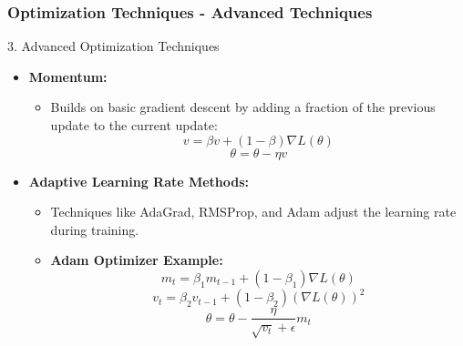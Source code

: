 \documentclass[aspectratio=169]{beamer}
\begin{document}
\begin{frame}[fragile]
    \frametitle{Optimization Techniques - Advanced Techniques}
    \begin{block}{3. Advanced Optimization Techniques}
        \begin{itemize}
            \item \textbf{Momentum:}
                \begin{itemize}
                    \item Builds on basic gradient descent by adding a fraction of the previous update to the current update:
                    \begin{equation}
                        v = \beta v + (1-\beta) \nabla L(\theta)
                    \end{equation}
                    \begin{equation}
                        \theta = \theta - \eta v
                    \end{equation}
                \end{itemize}
            \item \textbf{Adaptive Learning Rate Methods:}
                \begin{itemize}
                    \item Techniques like AdaGrad, RMSProp, and Adam adjust the learning rate during training.
                    \item \textbf{Adam Optimizer Example:}
                    \begin{equation}
                        m_t = \beta_1 m_{t-1} + (1 - \beta_1) \nabla L(\theta)
                    \end{equation}
                    \begin{equation}
                        v_t = \beta_2 v_{t-1} + (1 - \beta_2) (\nabla L(\theta))^2
                    \end{equation}
                    \begin{equation}
                        \theta = \theta - \frac{\eta}{\sqrt{v_t} + \epsilon} m_t
                    \end{equation}
                \end{itemize}
        \end{itemize}
    \end{block}
\end{frame}
\end{document}
